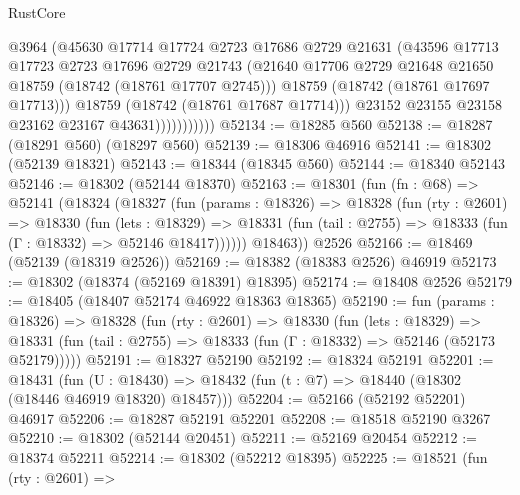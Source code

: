 \begin{lexlean}{RustCore}
\begin{coremodule}
                          @3964
                          (@45630
                            @17714
                            @17724
                            @2723
                            @17686
                            @2729
                            @21631
                            (@43596
                              @17713
                              @17723
                              @2723
                              @17696
                              @2729
                              @21743
                              (@21640
                                @17706
                                @2729
                                @21648
                                @21650
                                @18759
                                (@18742 (@18761 @17707 @2745)))
                              @18759
                              (@18742 (@18761 @17697 @17713)))
                            @18759
                            (@18742 (@18761 @17687 @17714)))
                          @23152
                          @23155
                          @23158
                          @23162
                          @23167
                          @43631)))))))))))
@52134 := @18285 @560
@52138 := @18287 (@18291 @560) (@18297 @560)
@52139 := @18306 @46916
@52141 := @18302 (@52139 @18321)
@52143 := @18344 (@18345 @560)
@52144 := @18340 @52143
@52146 := @18302 (@52144 @18370)
@52163 := @18301
    (fun (fn : @68) =>
    @52141
      (@18324
        (@18327
          (fun (params : @18326) =>
          @18328
            (fun (rty : @2601) =>
            @18330
              (fun (lets : @18329) =>
              @18331 (fun (tail : @2755) => @18333 (fun (Γ : @18332) => @52146 @18417))))))
        @18463))
    @2526
@52166 := @18469 (@52139 (@18319 @2526))
@52169 := @18382 (@18383 @2526) @46919
@52173 := @18302 (@18374 (@52169 @18391) @18395)
@52174 := @18408 @2526
@52179 := @18405 (@18407 @52174 @46922 @18363 @18365)
@52190 := fun (params : @18326) =>
  @18328
    (fun (rty : @2601) =>
    @18330
      (fun (lets : @18329) =>
      @18331 (fun (tail : @2755) => @18333 (fun (Γ : @18332) => @52146 (@52173 @52179)))))
@52191 := @18327 @52190
@52192 := @18324 @52191
@52201 := @18431
    (fun (U : @18430) => @18432 (fun (t : @7) => @18440 (@18302 (@18446 @46919 @18320) @18457)))
@52204 := @52166 (@52192 @52201) @46917
@52206 := @18287 @52191 @52201
@52208 := @18518 @52190 @3267
@52210 := @18302 (@52144 @20451)
@52211 := @52169 @20454
@52212 := @18374 @52211
@52214 := @18302 (@52212 @18395)
@52225 := @18521
    (fun (rty : @2601) =>

\end{coremodule}
\end{lexlean}
